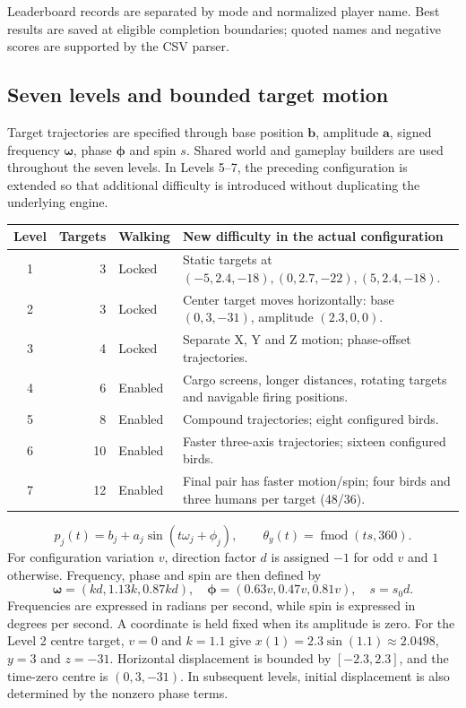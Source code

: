 Leaderboard records are separated by mode and normalized player name. Best results are saved at eligible completion boundaries; quoted names and negative scores are supported by the CSV parser.
\subsection{Seven levels and bounded target motion}
Target trajectories are specified through base position $\mathbf b$, amplitude $\mathbf a$, signed frequency $\boldsymbol\omega$, phase $\boldsymbol\phi$ and spin $s$. Shared world and gameplay builders are used throughout the seven levels. In Levels 5--7, the preceding configuration is extended so that additional difficulty is introduced without duplicating the underlying engine.
\begin{center}\begin{tabularx}{\linewidth}{crlX}\toprule
Level & Targets & Walking & New difficulty in the actual configuration \\\midrule
1 &3&Locked&Static targets at $(-5,2.4,-18),(0,2.7,-22),(5,2.4,-18)$.\\
2 &3&Locked&Center target moves horizontally: base $(0,3,-31)$, amplitude $(2.3,0,0)$.\\
3 &4&Locked&Separate X, Y and Z motion; phase-offset trajectories.\\
4 &6&Enabled&Cargo screens, longer distances, rotating targets and navigable firing positions.\\
5 &8&Enabled&Compound trajectories; eight configured birds.\\
6 &10&Enabled&Faster three-axis trajectories; sixteen configured birds.\\
7 &12&Enabled&Final pair has faster motion/spin; four birds and three humans per target (48/36).\\\bottomrule
\end{tabularx}\end{center}
\begin{equation}
 p_j(t)=b_j+a_j\sin(t\omega_j+\phi_j),\qquad \theta_y(t)=\operatorname{fmod}(ts,360).
\end{equation}
For configuration variation $v$, direction factor $d$ is assigned $-1$ for odd $v$ and $1$ otherwise. Frequency, phase and spin are then defined by
\[
 \boldsymbol\omega=(kd,1.13k,0.87kd),\quad
 \boldsymbol\phi=(0.63v,0.47v,0.81v),\quad s=s_0d.
\]
Frequencies are expressed in radians per second, while spin is expressed in degrees per second. A coordinate is held fixed when its amplitude is zero. For the Level 2 centre target, $v=0$ and $k=1.1$ give $x(1)=2.3\sin(1.1)\approx2.0498$, $y=3$ and $z=-31$. Horizontal displacement is bounded by $[-2.3,2.3]$, and the time-zero centre is $(0,3,-31)$. In subsequent levels, initial displacement is also determined by the nonzero phase terms.

